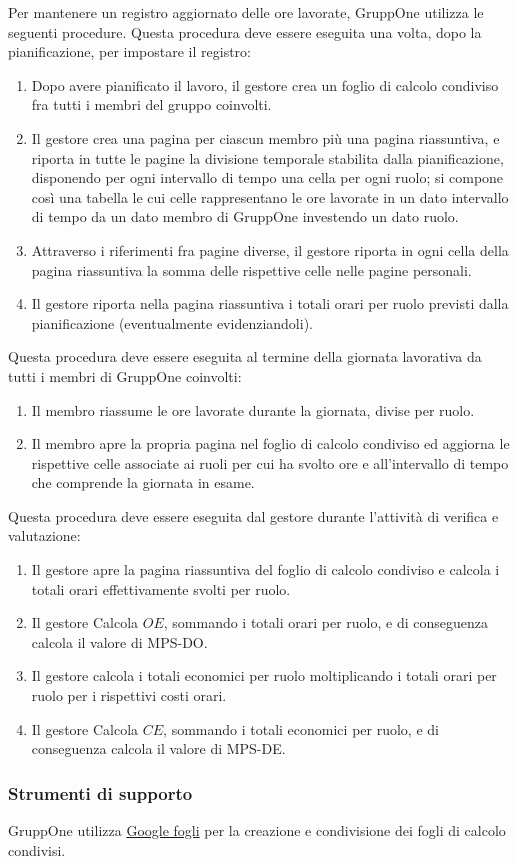 \documentclass[../../norme-di-progetto.tex]{subfiles}
\begin{document}
Per mantenere un registro aggiornato delle ore lavorate, GruppOne utilizza le seguenti procedure.
Questa procedura deve essere eseguita una volta, dopo la pianificazione, per impostare il registro:

\begin{enumerate}
  \item Dopo avere pianificato il lavoro, il gestore crea un foglio di calcolo condiviso fra tutti i membri del gruppo coinvolti.
  \item Il gestore crea una pagina per ciascun membro più una pagina riassuntiva, e riporta in tutte le pagine la divisione temporale stabilita dalla pianificazione, disponendo per ogni intervallo di tempo una cella per ogni ruolo; si compone così una tabella le cui celle rappresentano le ore lavorate in un dato intervallo di tempo da un dato membro di GruppOne investendo un dato ruolo.
  \item Attraverso i riferimenti fra pagine diverse, il gestore riporta in ogni cella della pagina riassuntiva la somma delle rispettive celle nelle pagine personali.
  \item Il gestore riporta nella pagina riassuntiva i totali orari per ruolo previsti dalla pianificazione (eventualmente evidenziandoli).
\end{enumerate}

Questa procedura deve essere eseguita al termine della giornata lavorativa da tutti i membri di GruppOne coinvolti:

\begin{enumerate}
  \item Il membro riassume le ore lavorate durante la giornata, divise per ruolo.
  \item Il membro apre la propria pagina nel foglio di calcolo condiviso ed aggiorna le rispettive celle associate ai ruoli per cui ha svolto ore e all'intervallo di tempo che comprende la giornata in esame.
\end{enumerate}

Questa procedura deve essere eseguita dal gestore durante l'attività di verifica e valutazione:

\begin{enumerate}
  \item Il gestore apre la pagina riassuntiva del foglio di calcolo condiviso e calcola i totali orari effettivamente svolti per ruolo.
  \item Il gestore Calcola \(OE\), sommando i totali orari per ruolo, e di conseguenza calcola il valore di MPS-DO\@.
  \item Il gestore calcola i totali economici per ruolo moltiplicando i totali orari per ruolo per i rispettivi costi orari.
  \item Il gestore Calcola \(CE\), sommando i totali economici per ruolo, e di conseguenza calcola il valore di MPS-DE\@.
\end{enumerate}

\subsubsection{Strumenti di supporto}%
\label{subs:gestione-di-processo/strumenti_di_supporto}

GruppOne utilizza \href{https://www.google.com/sheets/about/}{Google fogli} per la creazione e condivisione dei fogli di calcolo condivisi.
\end{document}

